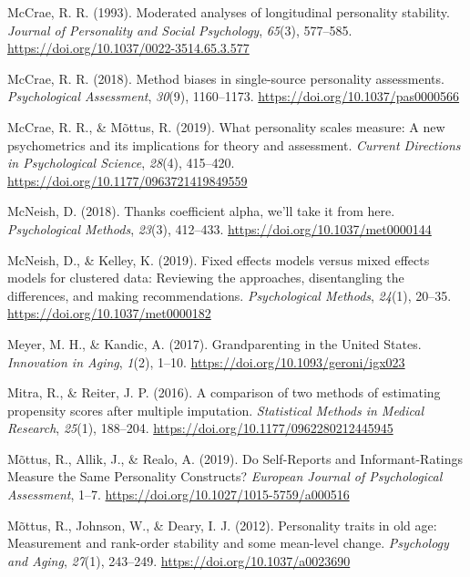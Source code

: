 \documentclass[
  english,
  man,floatsintext]{apa7}
\begin{document}
\leavevmode\hypertarget{ref-mccraeModeratedAnalysesLongitudinal1993}{}%
McCrae, R. R. (1993). Moderated analyses of longitudinal personality stability. \emph{Journal of Personality and Social Psychology}, \emph{65}(3), 577--585. \url{https://doi.org/10.1037/0022-3514.65.3.577}

\leavevmode\hypertarget{ref-mccraeMethodBiasesSinglesource2018}{}%
McCrae, R. R. (2018). Method biases in single-source personality assessments. \emph{Psychological Assessment}, \emph{30}(9), 1160--1173. \url{https://doi.org/10.1037/pas0000566}

\leavevmode\hypertarget{ref-mccraeWhatPersonalityScales2019}{}%
McCrae, R. R., \& Mõttus, R. (2019). What personality scales measure: A new psychometrics and its implications for theory and assessment. \emph{Current Directions in Psychological Science}, \emph{28}(4), 415--420. \url{https://doi.org/10.1177/0963721419849559}

\leavevmode\hypertarget{ref-mcneishThanksCoefficientAlpha2018}{}%
McNeish, D. (2018). Thanks coefficient alpha, we'll take it from here. \emph{Psychological Methods}, \emph{23}(3), 412--433. \url{https://doi.org/10.1037/met0000144}

\leavevmode\hypertarget{ref-mcneishFixedEffectsModels2019}{}%
McNeish, D., \& Kelley, K. (2019). Fixed effects models versus mixed effects models for clustered data: Reviewing the approaches, disentangling the differences, and making recommendations. \emph{Psychological Methods}, \emph{24}(1), 20--35. \url{https://doi.org/10.1037/met0000182}

\leavevmode\hypertarget{ref-meyerGrandparentingUnitedStates2017}{}%
Meyer, M. H., \& Kandic, A. (2017). Grandparenting in the United States. \emph{Innovation in Aging}, \emph{1}(2), 1--10. \url{https://doi.org/10.1093/geroni/igx023}

\leavevmode\hypertarget{ref-mitraComparisonTwoMethods2016}{}%
Mitra, R., \& Reiter, J. P. (2016). A comparison of two methods of estimating propensity scores after multiple imputation. \emph{Statistical Methods in Medical Research}, \emph{25}(1), 188--204. \url{https://doi.org/10.1177/0962280212445945}

\leavevmode\hypertarget{ref-mottusSelfReportsInformantRatingsMeasure2019}{}%
Mõttus, R., Allik, J., \& Realo, A. (2019). Do Self-Reports and Informant-Ratings Measure the Same Personality Constructs? \emph{European Journal of Psychological Assessment}, 1--7. \url{https://doi.org/10.1027/1015-5759/a000516}

\leavevmode\hypertarget{ref-mottusPersonalityTraitsOld2012}{}%
Mõttus, R., Johnson, W., \& Deary, I. J. (2012). Personality traits in old age: Measurement and rank-order stability and some mean-level change. \emph{Psychology and Aging}, \emph{27}(1), 243--249. \url{https://doi.org/10.1037/a0023690}
\end{document}
